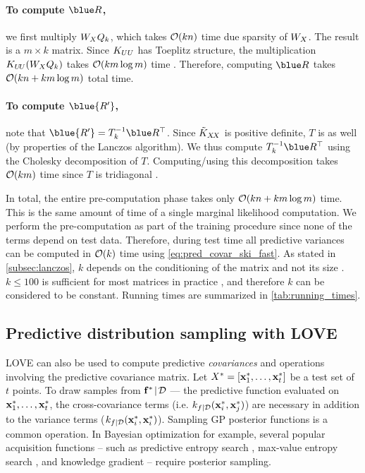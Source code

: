 \paragraph{To compute $\blue R$,} we first multiply $W_{X}Q_{k}$, which takes $\bigo{kn}$ time due sparsity of $W_{X}$.
The result is a $m \times k$ matrix.
Since $K_{UU}$ has Toeplitz structure, the multiplication $K_{U\!U} (W_{X}Q_{k})$ takes $\bigo{km \log m}$ time \cite{saatcci2012scalable}.
Therefore, computing $\blue R$ takes $\bigo{kn + km\log m}$ total time.

\paragraph{To compute $\blue {R'}$,} note that $\blue{R'} = T^{-1}_{k}\blue R^{\top}$.
Since $\tilde {K}_{X\!X}$ is positive definite, $T$ is as well (by properties of the Lanczos algorithm).
We thus compute $T^{-1}_k \blue R^\top$ using the Cholesky decomposition of $T$.
Computing/using this decomposition takes $\bigo{km}$ time since $T$ is tridiagonal \cite{loan1999introduction}.

In total, the entire pre-computation phase takes only $\bigo{kn + km \log m}$ time.
This is the same amount of time of a single marginal likelihood computation.
We perform the pre-computation as part of the training procedure since none of the terms depend on test data.
Therefore, during test time all predictive variances can be computed in $\bigo{k}$ time using \eqref{eq:pred_covar_ski_fast}.
As stated in \autoref{subsec:lanczos}, $k$ depends on the conditioning of the matrix and not its size \cite{golub2012matrix}.
$k\leq100$ is sufficient for most matrices in practice \cite{golub2012matrix}, and therefore $k$ can be considered to be constant.
Running times are summarized in \autoref{tab:running_times}.

\subsection{Predictive distribution sampling with LOVE{}}
\label{sec:sampling_method}

LOVE{} can also be used to compute predictive \emph{covariances} and operations involving the predictive covariance matrix.
Let $X^* = [\mathbf{x}^*_1, \ldots, \mathbf{x}^*_t]$ be a test set of $t$ points.
To draw samples from $\mathbf{f}^* \! \mid \! \mathcal D$ --- the predictive function evaluated on $\mathbf{x}^*_1, \ldots, \mathbf{x}^*_t$, the cross-covariance terms (i.e. $k_{f \mid \mathcal D} (\mathbf{x}^*_i, \mathbf{x}^*_j)$) are necessary in addition to the variance terms ($k_{f \mid \mathcal D} (\mathbf{x}^*_i, \mathbf{x}^*_i)$).
Sampling GP posterior functions is a common operation.
In Bayesian optimization for example, several popular acquisition functions -- such as predictive entropy search \cite{hernandez2014predictive}, max-value entropy search \cite{wang2017max}, and knowledge gradient \cite{frazier2009knowledge} -- require posterior sampling.

